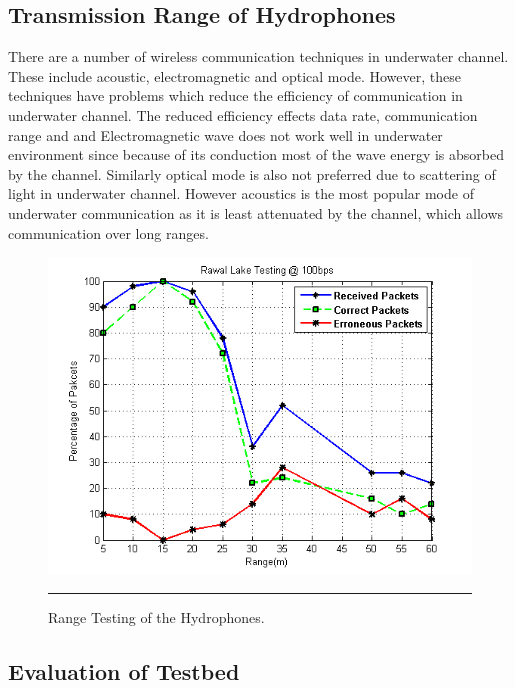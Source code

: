 \subsection{Transmission Range of Hydrophones }

There are a number of wireless communication techniques in underwater channel. These include acoustic, electromagnetic and optical mode. However, these techniques have problems which reduce the efficiency of communication in underwater channel. The reduced efficiency effects data rate, communication range and and Electromagnetic wave does not work well in underwater environment since because of its conduction most of the wave energy is absorbed by the channel.
Similarly optical mode is also not preferred due to scattering of light in underwater channel.
However acoustics is the most popular mode of underwater communication as it is least attenuated by the channel, which allows communication over long ranges. 
\begin{figure}[htbp]
	\centering
		\includegraphics[width=5in]{Figures/Rawal_dam.png}
		\rule{35em}{0.5pt}
	\caption[Range Testing of the Hydrophones]{Range Testing of the Hydrophones.}
	\label{fig:rawal}
\end{figure}

\subsection{Evaluation of Testbed }

